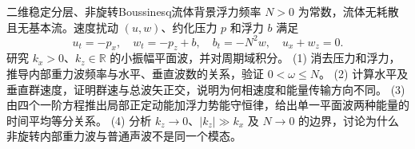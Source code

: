 二维稳定分层、非旋转Boussinesq流体背景浮力频率 \(N>0\) 为常数，流体无耗散且无基本流。速度扰动 \((u,w)\)、约化压力 \(p\) 和浮力 \(b\) 满足
\[
u_t=-p_x,\quad w_t=-p_z+b,\quad b_t=-N^2w,\quad u_x+w_z=0.
\]
研究 \(k_x>0\)、\(k_z\in\mathbb R\) 的小振幅平面波，并对周期域积分。
(1) 消去压力和浮力，推导内部重力波频率与水平、垂直波数的关系，验证 \(0<\omega\le N\)。
(2) 计算水平及垂直群速度，证明群速与总波矢正交，说明为何相速度和能量传输方向不同。
(3) 由四个一阶方程推出局部正定动能加浮力势能守恒律，给出单一平面波两种能量的时间平均等分关系。
(4) 分析 \(k_z\to0\)、\(|k_z|\gg k_x\) 及 \(N\to0\) 的边界，讨论为什么非旋转内部重力波与普通声波不是同一个模态。
